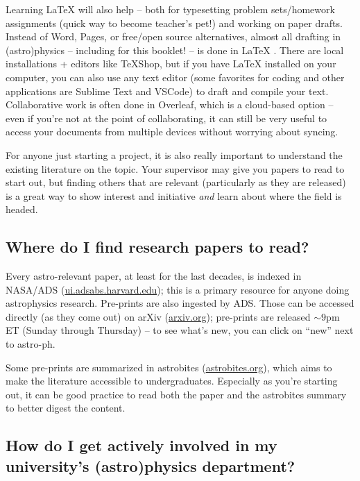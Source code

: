 Learning LaTeX will also help -- both for typesetting problem sets/homework assignments (quick way to become teacher's pet!) and working on paper drafts. Instead of Word, Pages, or free/open source alternatives, almost all drafting in (astro)physics -- including for this booklet! -- is done in LaTeX . There are local installations + editors like TeXShop, but if you have LaTeX installed on your computer, you can also use any text editor (some favorites for coding and other applications are Sublime Text and VSCode) to draft and compile your text. Collaborative work is often done in Overleaf, which is a cloud-based option -- even if you're not at the point of collaborating, it can still be very useful to access your documents from multiple devices without worrying about syncing.

For anyone just starting a project, it is also really important to understand the existing literature on the topic. Your supervisor may give you papers to read to start out, but finding others that are relevant (particularly as they are released) is a great way to show interest and initiative \textit{and} learn about where the field is headed.

\vspace{-2cm}

\subsection{Where do I find research papers to read?}

Every astro-relevant paper, at least for the last decades, is indexed in NASA/ADS (\href{https://ui.adsabs.harvard.edu/}{ui.adsabs.harvard.edu}); this is a primary resource for anyone doing astrophysics research. Pre-prints are also ingested by ADS. Those can be accessed directly (as they come out) on arXiv (\href{https://arxiv.org/}{arxiv.org}); pre-prints are released $\sim 9$pm ET (Sunday through Thursday) -- to see what's new, you can click on ``new'' next to astro-ph.

Some pre-prints are summarized in astrobites (\href{https://astrobites.org/}{astrobites.org}), which aims to make the literature accessible to undergraduates. Especially as you're starting out, it can be good practice to read both the paper and the astrobites summary to better digest the content.

\subsection{How do I get actively involved in my university's (astro)physics department?}

